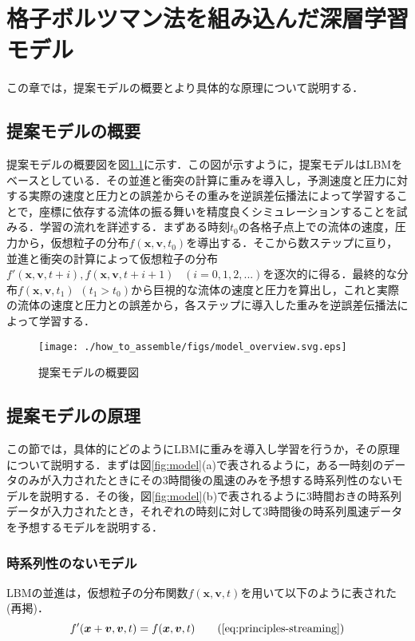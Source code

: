 \chapter{格子ボルツマン法を組み込んだ深層学習モデル\label{chap:how-to-assemble}}
この章では，提案モデルの概要とより具体的な原理について説明する．

\section{提案モデルの概要}
提案モデルの概要図を図\ref{fig:overview}に示す．この図が示すように，提案モデルはLBMをベースとしている．その並進と衝突の計算に重みを導入し，予測速度と圧力に対する実際の速度と圧力との誤差からその重みを逆誤差伝播法によって学習することで，座標に依存する流体の振る舞いを精度良くシミュレーションすることを試みる．学習の流れを詳述する．まずある時刻$t_0$の各格子点上での流体の速度，圧力から，仮想粒子の分布$f(\bm{x}, \bm{v}, t_0)$を導出する．そこから数ステップに亘り，並進と衝突の計算によって仮想粒子の分布$f'(\bm{x}, \bm{v}, t+i), f(\bm{x}, \bm{v}, t+i+1) \hspace{10pt}(i=0,1,2,...)$を逐次的に得る．最終的な分布$f(\bm{x}, \bm{v}, t_1) \hspace{5pt}(t_1>t_0)$から巨視的な流体の速度と圧力を算出し，これと実際の流体の速度と圧力との誤差から，各ステップに導入した重みを逆誤差伝播法によって学習する．
\begin{figure}[htbp]
  \centering
  \texttt{[image: ./how\_to\_assemble/figs/model\_overview.svg.eps]}
  \caption{提案モデルの概要図}
  \label{fig:overview}
\end{figure}

\section{提案モデルの原理}
この節では，具体的にどのようにLBMに重みを導入し学習を行うか，その原理について説明する．まずは図\ref{fig:model}(a)で表されるように，ある一時刻のデータのみが入力されたときにその3時間後の風速のみを予想する時系列性のないモデルを説明する．その後，図\ref{fig:model}(b)で表されるように3時間おきの時系列データが入力されたとき，それぞれの時刻に対して3時間後の時系列風速データを予想するモデルを説明する．

\subsection{時系列性のないモデル}
LBMの並進は，仮想粒子の分布関数$f(\bm{x}, \bm{v}, t)$を用いて以下のように表された(再掲)．
\begin{equation}
  f'(\bm{x}+\bm{v}, \bm{v}, t)
  = f(\bm{x}, \bm{v}, t)
  \tag{\ref{eq:principles-streaming}}
\end{equation}

